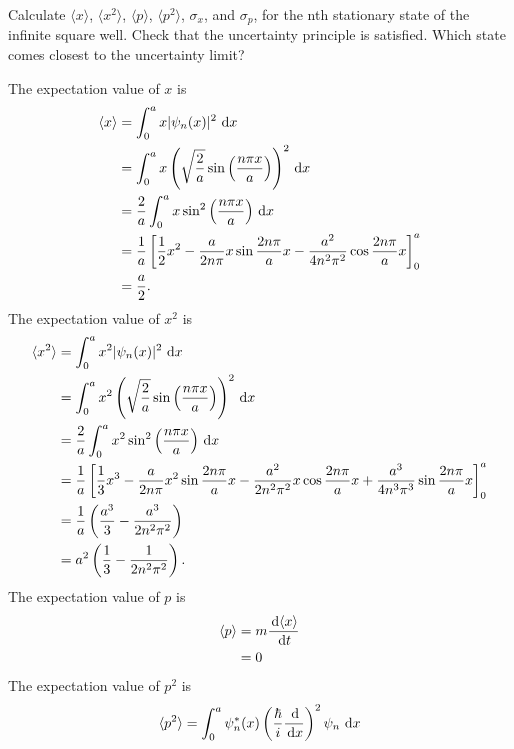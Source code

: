 \documentclass[en, oneside]{vivi}
\begin{document}
\begin{prob}
    Calculate $\langle x \rangle$, $\langle x^2 \rangle$, $\langle p \rangle$, $\langle p^2 \rangle$, $\sigma_x$, and $\sigma_p$, 
    for the nth stationary state of the infinite square well. Check that the uncertainty principle is satisfied. 
    Which state comes closest to the uncertainty limit?
\end{prob}

\begin{sol}
    The expectation value of $x$ is
    \begin{align*}
        \langle x \rangle &= \int_{0}^{a}x|\psi_n(x)|^2 \dif x\\
        &= \int_{0}^{a}x\left(\sqrt{\frac{2}{a}}\sin\left(\frac{n\pi x}{a}\right)\right)^2 \dif x\\
        &= \frac{2}{a} \int_{0}^{a} x \sin^2\left(\frac{n\pi x}{a}\right) \dif x\\
        &= \frac{1}{a} \left[ \frac{1}{2}x^2 - \frac{a}{2n\pi} x \sin \frac{2 n \pi}{a} x - \frac{a^2}{4n^2\pi^2} \cos \frac{2 n \pi}{a} x \right]_0^a\\
        &= \frac{a}{2}.
    \end{align*}
    The expectation value of $x^2$ is
    \begin{align*}
        \langle x^2 \rangle &= \int_{0}^{a}x^2|\psi_n(x)|^2 \dif x\\
        &= \int_{0}^{a}x^2\left(\sqrt{\frac{2}{a}}\sin\left(\frac{n\pi x}{a}\right)\right)^2 \dif x\\
        &= \frac{2}{a} \int_{0}^{a} x^2 \sin^2\left(\frac{n\pi x}{a}\right) \dif x\\
        &= \frac{1}{a} \left[ \frac{1}{3}x^3 - \frac{a}{2n\pi} x^2 \sin \frac{2 n \pi}{a} x - \frac{a^2}{2 n^2 \pi^2} x \cos \frac{2 n \pi}{a} x + \frac{a^3}{4 n^3 \pi^3} \sin \frac{2 n \pi}{a} x \right]_0^a\\
        &= \frac{1}{a} \left( \frac{a^3}{3} - \frac{a^3}{2 n^2 \pi^2} \right)\\
        &= a^2 \left( \frac{1}{3} - \frac{1}{2 n^2 \pi^2} \right).
    \end{align*}
    The expectation value of $p$ is
    \begin{align*}
        \langle p \rangle &= m \frac{\dif \langle x \rangle}{\dif t}\\
        &= 0
    \end{align*}
    The expectation value of $p^2$ is
    \begin{align*}
        \langle p^2 \rangle &= \int_{0}^{a} \psi_n^*(x) \left( \frac{\hbar}{i} \frac{\dif}{\dif x} \right)^2 \psi_n \dif x\\

\end{align*}
\end{sol}
\end{document}
